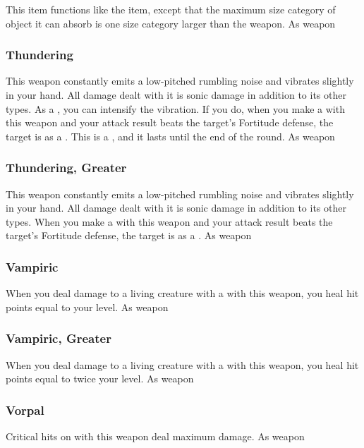 This item functions like the  item, except that the maximum size category of object it can absorb is one size category larger than the weapon.
 
 As weapon
\lowercase{\hypertarget{item:Thundering}{}}\label{item:Thundering}
\hypertarget{item:Thundering}{\subsubsection{Thundering\hfill{}}}
This weapon constantly emits a low-pitched rumbling noise and vibrates slightly in your hand.
All damage dealt with it is sonic damage in addition to its other types.
As a , you can intensify the vibration.
If you do, when you make a  with this weapon and your attack result beats the target's Fortitude defense, the target is \deafened as a .
This is a , and it lasts until the end of the round.
 
 As weapon
\lowercase{\hypertarget{item:Thundering, Greater}{}}\label{item:Thundering, Greater}
\hypertarget{item:Thundering, Greater}{\subsubsection{Thundering, Greater\hfill{}}}
This weapon constantly emits a low-pitched rumbling noise and vibrates slightly in your hand.
All damage dealt with it is sonic damage in addition to its other types.
When you make a  with this weapon and your attack result beats the target's Fortitude defense, the target is \deafened as a .
 
 As weapon
\lowercase{\hypertarget{item:Vampiric}{}}\label{item:Vampiric}
\hypertarget{item:Vampiric}{\subsubsection{Vampiric\hfill{}}}
When you deal damage to a living creature with a  with this weapon, you heal hit points equal to your level.
 
 As weapon
\lowercase{\hypertarget{item:Vampiric, Greater}{}}\label{item:Vampiric, Greater}
\hypertarget{item:Vampiric, Greater}{\subsubsection{Vampiric, Greater\hfill{}}}
When you deal damage to a living creature with a  with this weapon, you heal hit points equal to twice your level.
 
 As weapon
\lowercase{\hypertarget{item:Vorpal}{}}\label{item:Vorpal}
\hypertarget{item:Vorpal}{\subsubsection{Vorpal\hfill{}}}
Critical hits on  with this weapon deal maximum damage.
 
 As weapon